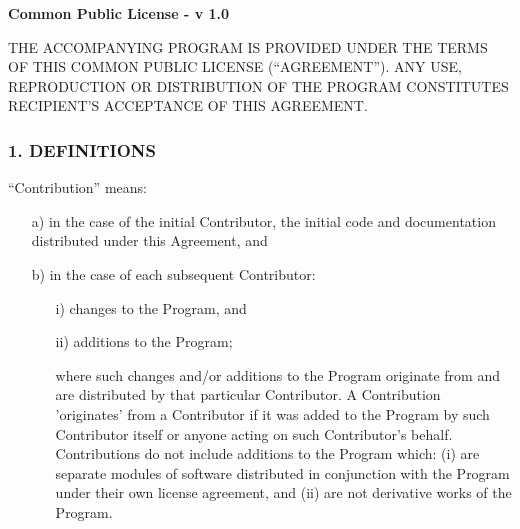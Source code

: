 
\begin{center}
{\bf Common Public License - v 1.0}
\end{center}

THE ACCOMPANYING PROGRAM IS
PROVIDED UNDER THE TERMS OF THIS COMMON PUBLIC LICENSE (``AGREEMENT'').
ANY USE, REPRODUCTION OR DISTRIBUTION OF THE PROGRAM CONSTITUTES
RECIPIENT'S ACCEPTANCE OF THIS AGREEMENT.


\subsubsection*{1.  DEFINITIONS}

``Contribution'' means:

\begin{itemize}

\item[a)] in the case of the initial Contributor, the initial code and
documentation distributed under this Agreement, and

\item[b)] in the case of each subsequent Contributor:

\begin{itemize}

\item[i)]	 	changes to the Program, and


\item[ii)]		additions to the Program;


where such changes and/or additions to the Program originate from and are distributed by that particular Contributor.  A
Contribution 'originates' from a Contributor if it was added to the
Program by such Contributor itself or anyone acting on such
Contributor's behalf. Contributions do not
include additions to the Program which: (i) are separate modules of
software distributed in conjunction with the Program under their own
license agreement, and (ii) are not derivative works of the Program. 
\end{itemize}
\end{itemize}

